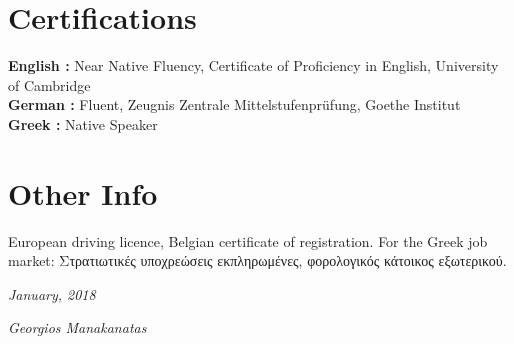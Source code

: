 \documentclass[]{friggeri-cv}
\begin{document}
\section{Certifications}
    \textbf{English :}
    Near Native Fluency, Certificate of Proficiency in English, University of Cambridge\\
    \textbf{German :}
    Fluent, Zeugnis Zentrale Mittelstufenprüfung, Goethe Institut\\
    \textbf{Greek :}
    Native Speaker
\\
\section{Other Info}
European driving licence, Belgian certificate of registration. For the Greek job market: Στρατιωτικές υποχρεώσεις εκπληρωμένες, φορολογικός κάτοικος εξωτερικού.
\begin{flushleft}
\emph{January, 2018}
\end{flushleft}
\begin{flushright}
\emph{Georgios Manakanatas}
\end{flushright}

% 
\end{document}
